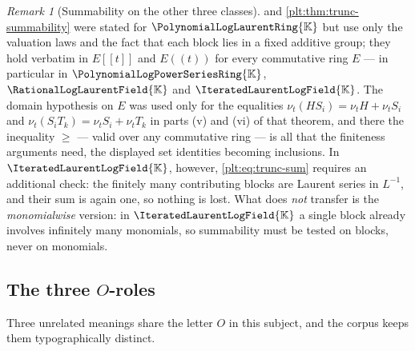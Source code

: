 \documentclass[11pt,oneside]{article}
\theoremstyle{plain}
\theoremstyle{definition}
\theoremstyle{remark}
\newtheorem{remark}[theorem]{Remark}
\newcommand{\K}{\mathbb{K}}
\newcommand{\PLpow}{\PolynomialLogPowerSeriesRing{\K}}   %
\newcommand{\PLlau}{\PolynomialLogLaurentRing{\K}}       %
\newcommand{\PLrat}{\RationalLogLaurentField{\K}}        %
\newcommand{\PLit}{\IteratedLaurentLogField{\K}}         %
\newcommand{\ordt}{\nu_{t}}                              %
\begin{document}
\begin{remark}[Summability on the other three classes]
\label{plt:rmk:trunc-summability-classes}
 and
\cref{plt:thm:trunc-summability} were stated for \(\PLlau\) but use only the
valuation laws and the fact that each block lies in a fixed additive group;
they hold verbatim in \(E[[t]]\) and \(E((t))\) for every commutative ring
\(E\) --- in particular in \(\PLpow\), \(\PLrat\) and \(\PLit\).  The domain
hypothesis on \(E\) was used only for the equalities
\(\ordt(HS_i)=\ordt H+\ordt S_i\) and
\(\ordt(S_iT_k)=\ordt S_i+\ordt T_k\) in parts (v) and (vi) of that theorem,
and there the inequality \(\ge\) --- valid over any commutative ring --- is
all that the finiteness arguments need, the displayed set identities becoming
inclusions.  In \(\PLit\),
however, \eqref{plt:eq:trunc-sum} requires an additional check: the finitely
many contributing blocks are Laurent series in \(L^{-1}\), and their sum is
again one, so nothing is lost.  What does \emph{not} transfer is the
\emph{monomialwise} version: in \(\PLit\) a single block already involves
infinitely many monomials, so summability must be tested on blocks, never on
monomials.
\end{remark}

\subsection{The three \texorpdfstring{\(O\)}{O}-roles}
\label{plt:sec:trunc-three-o}

\begin{warningbox}[title={Never infer one \(O\)-role from another}]
\label{plt:rmk:trunc-three-o}
Three unrelated meanings share the letter \(O\) in this subject, and the
corpus keeps them typographically distinct.
\end{warningbox}
\end{document}
